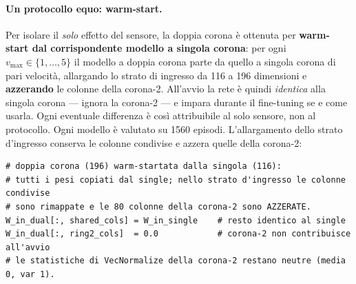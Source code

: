 \paragraph{Un protocollo equo: warm-start.} Per isolare il \emph{solo} effetto del
sensore, la doppia corona \`e ottenuta per \textbf{warm-start dal corrispondente modello a
singola corona}: per ogni $v_{\max} \in \{1,\ldots,5\}$ il modello a doppia corona parte
da quello a singola corona di pari velocit\`a, allargando lo strato di ingresso da 116 a
196 dimensioni e \textbf{azzerando} le colonne della corona-2. All'avvio la rete \`e
quindi \emph{identica} alla singola corona --- ignora la corona-2 --- e impara durante il
fine-tuning se e come usarla. Ogni eventuale differenza \`e cos\`i attribuibile al solo
sensore, non al protocollo. Ogni modello \`e valutato su 1560 episodi. L'allargamento dello
strato d'ingresso conserva le colonne condivise e azzera quelle della corona-2:

\begin{lstlisting}
# doppia corona (196) warm-startata dalla singola (116):
# tutti i pesi copiati dal single; nello strato d'ingresso le colonne condivise
# sono rimappate e le 80 colonne della corona-2 sono AZZERATE.
W_in_dual[:, shared_cols] = W_in_single    # resto identico al single
W_in_dual[:, ring2_cols]  = 0.0            # corona-2 non contribuisce all'avvio
# le statistiche di VecNormalize della corona-2 restano neutre (media 0, var 1).
\end{lstlisting}

